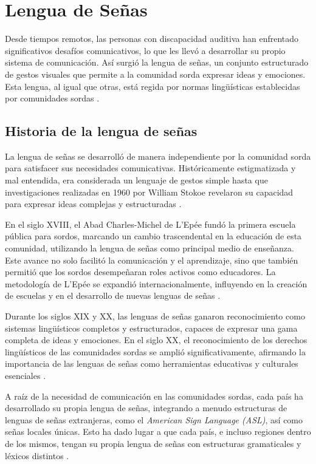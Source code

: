 \section{Lengua de Señas}
Desde tiempos remotos, las personas con discapacidad auditiva han enfrentado significativos desafíos comunicativos, lo que les llevó a desarrollar su propio sistema de comunicación. Así surgió la lengua de señas, un conjunto estructurado de gestos visuales que permite a la comunidad sorda expresar ideas y emociones. Esta lengua, al igual que otras, está regida por normas lingüísticas establecidas por comunidades sordas \cite{MarzoPena2022}.

\subsection{Historia de la lengua de señas}
La lengua de señas se desarrolló de manera independiente por la comunidad sorda para satisfacer sus necesidades comunicativas. Históricamente estigmatizada y mal entendida, era considerada un lenguaje de gestos simple hasta que investigaciones realizadas en 1960 por William Stokoe revelaron su capacidad para expresar ideas complejas y estructuradas \cite{RodriguezVelasquezSF}.

En el siglo XVIII, el Abad Charles-Michel de L’Epée fundó la primera escuela pública para sordos, marcando un cambio trascendental en la educación de esta comunidad, utilizando la lengua de señas como principal medio de enseñanza. Este avance no solo facilitó la comunicación y el aprendizaje, sino que también permitió que los sordos desempeñaran roles activos como educadores. La metodología de L’Epée se expandió internacionalmente, influyendo en la creación de escuelas y en el desarrollo de nuevas lenguas de señas \cite{RodriguezVelasquezSF}.

Durante los siglos XIX y XX, las lenguas de señas ganaron reconocimiento como sistemas lingüísticos completos y estructurados, capaces de expresar una gama completa de ideas y emociones. En el siglo XX, el reconocimiento de los derechos lingüísticos de las comunidades sordas se amplió significativamente, afirmando la importancia de las lenguas de señas como herramientas educativas y culturales esenciales \cite{RodriguezVelasquezSF}.

A raíz de la necesidad de comunicación en las comunidades sordas, cada país ha desarrollado su propia lengua de señas, integrando a menudo estructuras de lenguas de señas extranjeras, como el \textit{American Sign Language (ASL)}, así como señas locales únicas. Esto ha dado lugar a que cada país, e incluso regiones dentro de los mismos, tengan su propia lengua de señas con estructuras gramaticales y léxicos distintos \cite{RuizVilla2022}.

